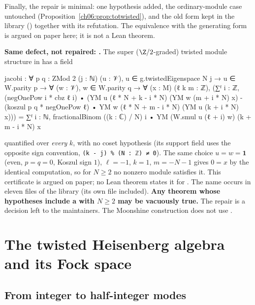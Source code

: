 Finally, the repair is minimal: one hypothesis added, the ordinary-module case untouched
(Proposition~\ref{ch06:prop:totwisted}), and the old form kept in the library
() together with its refutation.  The equivalence with the generating form
is argued on paper here; it is not a Lean theorem.

\begin{warning}
\textbf{Same defect, not repaired: .}  The super ($\Z/2$-graded) twisted
module structure  in  has a
field
\begin{leancode}
  jacobi : ∀ {p q : ZMod 2} (j : ℕ) (u : 𝒱),
    u ∈ g.twistedEigenspace N j → u ∈ W.parity p →
    ∀ (w : 𝒱), w ∈ W.parity q → ∀ (x : M) (ℓ k m : ℤ),
    (∑ᶠ i : ℤ, (negOnePow i * cbz ℓ i) •
        (YM u (ℓ * N + k - i * N) (YM w (m + i * N) x)
          - (koszul p q * negOnePow ℓ) •
            YM w (ℓ * N + m - i * N) (YM u (k + i * N) x))) =
      ∑ᶠ i : ℕ, fractionalBinom ((k : ℂ) / N) i •
        YM (W.smul u (ℓ + i) w) (k + m - i * N) x
\end{leancode}
quantified over \emph{every} $k$, with no coset hypothesis (its support field uses the opposite
sign convention, \texttt{(k - j) \% (N : ℤ) ≠ 0}).  The same choice $u=w=\mathbf 1$ (even, $p=q=0$,
Koszul sign $1$), $\ell=-1$, $k=1$, $m=-N-1$ gives $0=x$ by the identical computation, so for
$N\ge2$ no nonzero module satisfies it.  This certificate is argued on paper; no Lean theorem
states it for .  The name occurs in eleven files of the library (its own
file included).  \textbf{Any theorem whose hypotheses include a  with
$N\ge 2$ may be vacuously true.}  The repair is a decision left to the maintainers.  The Moonshine
construction does not use .
\end{warning}

\section{The twisted Heisenberg algebra and its Fock space}\label{ch06:sec:heis}

\subsection{From integer to half-integer modes}


